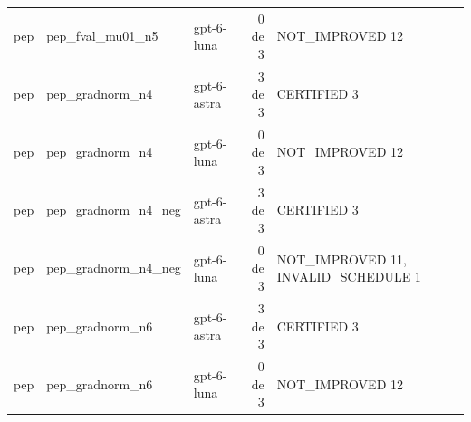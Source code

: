 \begin{tabular}{@{}lllr>{\raggedright\arraybackslash}p{5.0cm}@{}}
pep & pep\_fval\_mu01\_n5 & gpt-6-luna & 0 de 3 & {\footnotesize NOT\_IMPROVED 12}\\
pep & pep\_gradnorm\_n4 & gpt-6-astra & 3 de 3 & {\footnotesize CERTIFIED 3}\\
pep & pep\_gradnorm\_n4 & gpt-6-luna & 0 de 3 & {\footnotesize NOT\_IMPROVED 12}\\
pep & pep\_gradnorm\_n4\_neg & gpt-6-astra & 3 de 3 & {\footnotesize CERTIFIED 3}\\
pep & pep\_gradnorm\_n4\_neg & gpt-6-luna & 0 de 3 & {\footnotesize NOT\_IMPROVED 11, INVALID\_SCHEDULE 1}\\
pep & pep\_gradnorm\_n6 & gpt-6-astra & 3 de 3 & {\footnotesize CERTIFIED 3}\\
pep & pep\_gradnorm\_n6 & gpt-6-luna & 0 de 3 & {\footnotesize NOT\_IMPROVED 12}\\
\bottomrule
\end{tabular}
